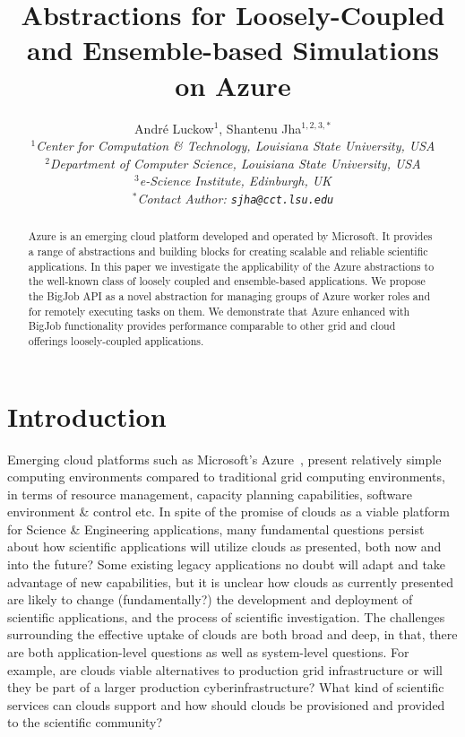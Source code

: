 \documentclass[conference,final]{IEEEtran}
\title{Abstractions for Loosely-Coupled and Ensemble-based Simulations
  on Azure\up}
\author{
Andr\'e Luckow$^{1}$, Shantenu Jha$^{1,2,3,*}$\\
  \small{\emph{$^{1}$Center for Computation \& Technology, Louisiana State University, USA}}\\
  \small{\emph{$^{2}$Department of Computer Science, Louisiana State University, USA}}\\
  \small{\emph{$^{3}$e-Science Institute, Edinburgh, UK}}\\
  \small{\emph{$^{*}$Contact Author: \texttt{sjha@cct.lsu.edu}}}\\
  \up\up\up\up
}
\newcommand{\up}{\vspace*{-1em}}
\newcommand{\alnote}[1]{ {\textcolor{blue} { ***AL: #1 }}}
\newcommand{\jhanote}[1]{ {\textcolor{red} { ***SJ: #1 }}}
\newcommand{\alnote}[1]{}
\newcommand{\jhanote}[1]{}
\begin{document}
 

\maketitle    

\begin{abstract}
  Azure is an emerging cloud platform developed and operated by
  Microsoft.  It provides a range of abstractions and building blocks
  for creating scalable and reliable scientific applications.  In this
  paper we investigate the applicability of the Azure abstractions to
  the well-known class of loosely coupled and ensemble-based
  applications.  We propose the BigJob API as a novel abstraction for
  managing groups of Azure worker roles and for remotely executing
  tasks on them. We demonstrate that Azure enhanced with BigJob
  functionality provides performance comparable to other grid and
  cloud offerings loosely-coupled applications.  \up \up

\end{abstract}
\section{Introduction}
\up
Emerging cloud platforms such as Microsoft's Azure~\cite{winazure},
present relatively simple computing environments compared to
traditional grid computing environments, in terms of resource
management, capacity planning capabilities, software environment \&
control etc. %
In spite of the promise of clouds as a
viable platform for Science \& Engineering applications, many
fundamental questions persist about how scientific applications will
utilize clouds as presented, both now and into the future? Some
existing legacy applications no doubt will adapt and take advantage of
new capabilities, but it is unclear how clouds as currently presented
are likely to change (fundamentally?)  the development and deployment
of scientific applications, and the process of scientific
investigation. The challenges surrounding the effective uptake of
clouds are both broad and deep, in that, there are both
application-level questions as well as system-level questions.  For
example, are clouds viable alternatives to production grid
infrastructure or will they be part of a larger production
cyberinfrastructure? What kind of scientific services can clouds
support and how should clouds be provisioned and provided to the
scientific community?
\end{document}
